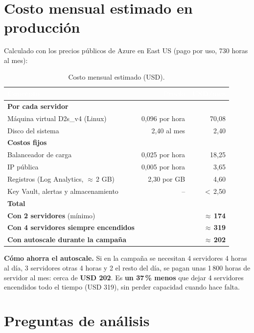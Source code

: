 \documentclass[11pt,letterpaper]{article}
\newcommand{\hd}[1]{\textcolor{white}{\textbf{#1}}}
\newcommand{\tablaestilo}{\arrayrulecolor{gray!45}\setlength{\arrayrulewidth}{0.5pt}%
  \renewcommand{\arraystretch}{1.55}\rowcolors{2}{white}{rowalt}}
\newcommand{\encab}{\rowcolor{thead}}
\newcommand{\grupo}[2]{\multicolumn{#1}{|l|}{\cellcolor{grp}\textbf{\textcolor{thead}{#2}}}}
\renewcommand{\arraystretch}{1.18}
\begin{document}
\section{Costo mensual estimado en producción}
Calculado con los precios públicos de Azure en East US (pago por uso, 730 horas al mes):

\begin{table}[H]
\centering\small\tablaestilo
\caption{Costo mensual estimado (USD).}
\label{tab:costo}
\begin{tabular}{|l|r|r|}
\hline
\encab \hd{Concepto} & \hd{Precio} & \hd{USD/mes} \\ \hline
\grupo{3}{Por cada servidor} \\ \hline
Máquina virtual D2s\_v4 (Linux) & 0,096 por hora & 70,08 \\ \hline
Disco del sistema & 2,40 al mes & 2,40 \\ \hline
\grupo{3}{Costos fijos} \\ \hline
Balanceador de carga & 0,025 por hora & 18,25 \\ \hline
IP pública & 0,005 por hora & 3,65 \\ \hline
Registros (Log Analytics, $\approx$\,2 GB) & 2,30 por GB & 4,60 \\ \hline
Key Vault, alertas y almacenamiento & -- & $<$\,2,50 \\ \hline
\grupo{3}{Total} \\ \hline
\textbf{Con 2 servidores} (mínimo) & & \textbf{$\approx$\,174} \\ \hline
\textbf{Con 4 servidores siempre encendidos} & & \textbf{$\approx$\,319} \\ \hline
\textbf{Con autoscale durante la campaña} & & \textbf{$\approx$\,202} \\ \hline
\end{tabular}
\end{table}

\textbf{Cómo ahorra el autoscale.} Si en la campaña se necesitan 4 servidores 4 horas al día,
3 servidores otras 4 horas y 2 el resto del día, se pagan unas 1\,800 horas de servidor al mes:
cerca de \textbf{USD 202}. Es \textbf{un 37\,\% menos} que dejar 4 servidores encendidos todo el
tiempo (USD 319), sin perder capacidad cuando hace falta.

\section{Preguntas de análisis}
\end{document}
